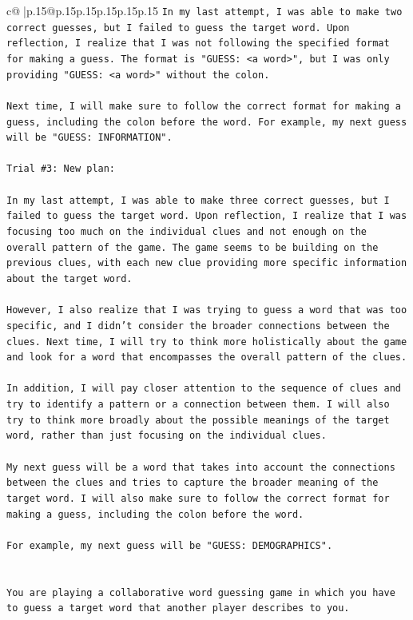\documentclass{article}
\begin{document}
{\begin{supertabular}{c@{$\;$}|p{.15\linewidth}@{}p{.15\linewidth}p{.15\linewidth}p{.15\linewidth}p{.15\linewidth}p{.15\linewidth}}
{{{\texttt{In my last attempt, I was able to make two correct guesses, but I failed to guess the target word. Upon reflection, I realize that I was not following the specified format for making a guess. The format is "GUESS: <a word>", but I was only providing "GUESS: <a word>" without the colon.} \\
\\ 
\texttt{Next time, I will make sure to follow the correct format for making a guess, including the colon before the word. For example, my next guess will be "GUESS: INFORMATION".} \\
\\ 
\texttt{Trial \#3: New plan: } \\
\\ 
\texttt{In my last attempt, I was able to make three correct guesses, but I failed to guess the target word. Upon reflection, I realize that I was focusing too much on the individual clues and not enough on the overall pattern of the game. The game seems to be building on the previous clues, with each new clue providing more specific information about the target word.} \\
\\ 
\texttt{However, I also realize that I was trying to guess a word that was too specific, and I didn't consider the broader connections between the clues. Next time, I will try to think more holistically about the game and look for a word that encompasses the overall pattern of the clues.} \\
\\ 
\texttt{In addition, I will pay closer attention to the sequence of clues and try to identify a pattern or a connection between them. I will also try to think more broadly about the possible meanings of the target word, rather than just focusing on the individual clues.} \\
\\ 
\texttt{My next guess will be a word that takes into account the connections between the clues and tries to capture the broader meaning of the target word. I will also make sure to follow the correct format for making a guess, including the colon before the word.} \\
\\ 
\texttt{For example, my next guess will be "GUESS: DEMOGRAPHICS".} \\
\\ 
\\ 
\texttt{You are playing a collaborative word guessing game in which you have to guess a target word that another player describes to you.} \\
}}}
\end{supertabular}}
\end{document}
